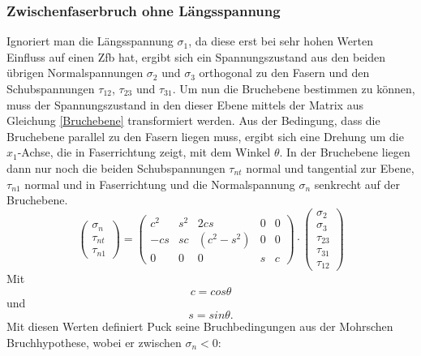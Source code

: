 \subsubsection{Zwischenfaserbruch ohne Längsspannung}
Ignoriert man die Längsspannung $\sigma_1$, da diese erst bei sehr hohen Werten Einfluss auf einen Zfb hat, ergibt sich ein Spannungszustand aus den beiden übrigen Normalspannungen $\sigma_2$ und $\sigma_3$ orthogonal zu den Fasern und den Schubspannungen $\tau_{12}$, $\tau_{23}$ und $\tau_{31}$. Um nun die Bruchebene bestimmen zu können, muss der Spannungszustand in den dieser Ebene mittels der Matrix aus Gleichung \ref{Bruchebene} transformiert werden. Aus der Bedingung, dass die Bruchebene parallel zu den Fasern liegen muss, ergibt sich eine Drehung um die $x_1$-Achse, die in Faserrichtung zeigt, mit dem Winkel $\theta$. In der Bruchebene liegen dann nur noch die beiden Schubspannungen $\tau_{nt}$ normal und tangential zur Ebene, $\tau_{n1}$ normal und in Faserrichtung und die Normalspannung $\sigma_n$ senkrecht auf der Bruchebene.
\begin{equation}\label{Bruchebene}
	\begin{pmatrix}
		\sigma_n \\ \tau_{nt} \\ \tau_{n1}
	\end{pmatrix}
	=
	\begin{pmatrix}
		c^2 & s^2 & 2cs & 0 & 0\\
		-cs & sc & (c^2-s^2) & 0 & 0\\
		0 & 0 & 0 & s & c
	\end{pmatrix}
	\cdot
	\begin{pmatrix}
		\sigma_2 \\ \sigma_3 \\ \tau_{23} \\ \tau_{31} \\ \tau_{12}
	\end{pmatrix}
\end{equation}
Mit
\begin{equation}
	c = cos\theta
\end{equation}
und
\begin{equation}
	s = sin\theta.
\end{equation}
Mit diesen Werten definiert Puck seine Bruchbedingungen aus der Mohrschen Bruchhypothese\cite{item3}, wobei er zwischen $\sigma_n < 0$:

